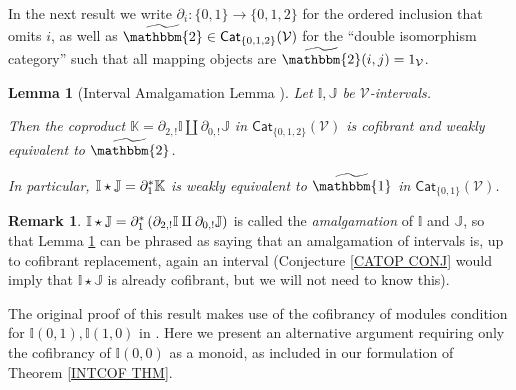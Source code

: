 \documentclass[a4paper,10pt
,draft
]{article}%
\numberwithin{equation}{section}
\numberwithin{figure}{section}
\newtheorem{lemma}[equation]{Lemma}%
\theoremstyle{definition} %
\newtheorem{remark}[equation]{Remark}%
\newcommand{\V}{\ensuremath{\mathcal V}}
\newcommand{\1}{\ensuremath{\mathbbm 1}}%
\begin{document}
In the next result we write 
$\partial_i \colon \{0,1\} \to \{0,1,2\}$
for the ordered inclusion that omits $i$,
as well as 
$\widetilde{\mathbbm{2}} \in
\mathsf{Cat}_{\{0,1,2\}}(\V)$
for the ``double isomorphism category''
such that all mapping objects are $\widetilde{\mathbbm{2}}(i,j)=1_{\V}$.



\begin{lemma}[Interval Amalgamation Lemma {\cite[Lemma 1.16]{BM13}}]
\label{AMALGLEM LEM}
Let $\mathbb{I},\mathbb{J}$ be $\V$-intervals.

Then the coproduct 
$\mathbb{K} = \partial_{2,!} \mathbb{I} \amalg \partial_{0,!} \mathbb{J}$
in $\mathsf{Cat}_{\{0,1,2\}}(\V)$
is cofibrant and weakly equivalent to $\widetilde{\mathbbm{2}}$.

In particular, 
$\mathbb{I} \star \mathbb{J} = \partial_1^{\**}\mathbb{K}$
is weakly equivalent to $\widetilde{\mathbbm{1}}$
in $\mathsf{Cat}_{\{0,1\}}(\V)$.
\end{lemma}




\begin{remark}
	$\mathbb{I} \star \mathbb{J} = \partial_1^{\**} \left(\partial_{2,!} \mathbb{I} \amalg \partial_{0,!} \mathbb{J}\right)$
is called the \emph{amalgamation} of $\mathbb{I}$ and $\mathbb{J}$,
so that Lemma \ref{AMALGLEM LEM} can be phrased as saying that an amalgamation of intervals is,
up to cofibrant replacement, again an interval
(Conjecture \ref{CATOP CONJ} would imply that $\mathbb{I} \star \mathbb{J}$ is already cofibrant, 
but we will not need to know this).
\end{remark}




The original proof of this result \cite[Lemma 1.16]{BM13} makes use of the cofibrancy of modules condition for
$\mathbb{I}(0,1),\mathbb{I}(1,0)$
in \cite[Thm 1.15]{BM13}.
Here we present an alternative argument requiring only the cofibrancy of $\mathbb{I}(0,0)$ as a monoid,
as included in our formulation of Theorem \ref{INTCOF THM}.
\end{document}
